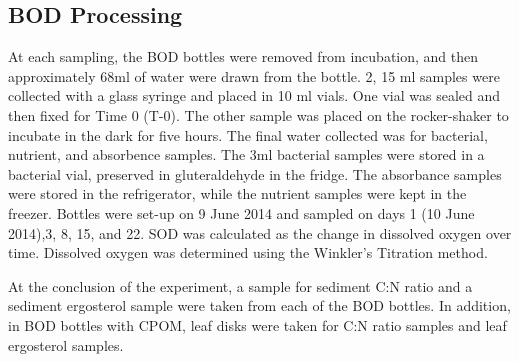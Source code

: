 \subsection{BOD Processing}
At each sampling, the BOD bottles were removed from incubation, and then approximately 68ml of water were drawn from the bottle. 2, 15 ml samples were collected with a glass syringe and placed in 10 ml vials. One vial was sealed and then fixed for Time 0 (T-0). The other sample was placed on the rocker-shaker to incubate in the dark for five hours. The final water collected was for bacterial, nutrient, and absorbence samples. The 3ml  bacterial samples were stored in a bacterial vial, preserved in gluteraldehyde in the fridge. The absorbance samples were stored in the refrigerator, while the nutrient samples were kept in the freezer. Bottles were set-up on 9 June 2014 and sampled on days 1 (10 June 2014),3, 8, 15, and 22. SOD was calculated as the change in dissolved oxygen over time. Dissolved oxygen was determined using the Winkler's Titration method. 

At the conclusion of the experiment, a sample for sediment C:N ratio and a sediment ergosterol sample were taken from each of the BOD bottles. In addition, in BOD bottles with CPOM, leaf disks were taken for C:N ratio samples and leaf ergosterol samples. 

    
    